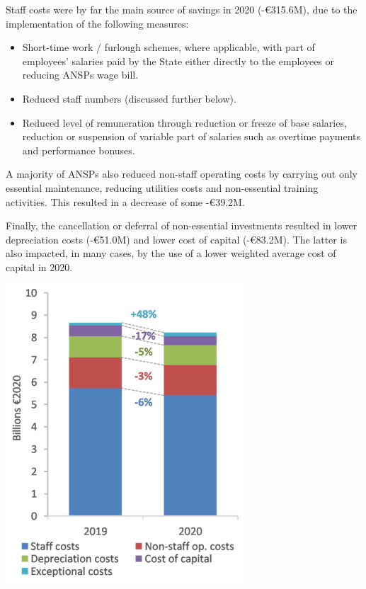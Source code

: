 \documentclass[
]{book}
\providecommand{\tightlist}{%
  \setlength{\itemsep}{0pt}\setlength{\parskip}{0pt}}
\begin{document}
Staff costs were by far the main source of savings in 2020 (-€315.6M),
due to the implementation of the following measures:

\begin{itemize}
\tightlist
\item
  Short-time work / furlough schemes, where applicable, with part of
  employees' salaries paid by the State either directly to the employees
  or reducing ANSPs wage bill.
\item
  Reduced staff numbers (discussed further below).
\item
  Reduced level of remuneration through reduction or freeze of base
  salaries, reduction or suspension of variable part of salaries such as
  overtime payments and performance bonuses.
\end{itemize}

A majority of ANSPs also reduced non-staff operating costs by carrying
out only essential maintenance, reducing utilities costs and
non-essential training activities. This resulted in a decrease of some
-€39.2M.

Finally, the cancellation or deferral of non-essential investments
resulted in lower depreciation costs (-€51.0M) and lower cost of capital
(-€83.2M). The latter is also impacted, in many cases, by the use of a
lower weighted average cost of capital in 2020.

\begin{center}\includegraphics[width=1\linewidth]{figures/Figure-2-4} \end{center}
\end{document}
